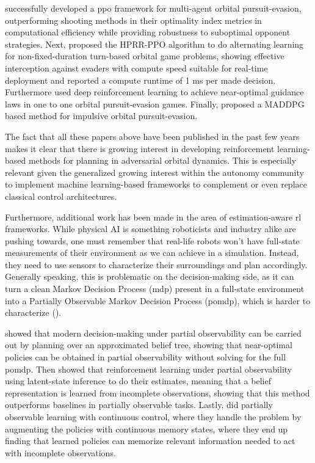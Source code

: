  \cite{li2025heterogeneousppo} successfully developed a \acs{ppo} framework for multi-agent orbital pursuit-evasion, outperforming shooting methods in their optimality index metrics in computational efficiency while providing robustness to suboptimal opponent strategies. Next, \cite{cao2026historyawareppo} proposed the HPRR-PPO algorithm to do alternating learning for non-fixed-duration turn-based orbital game problems, showing effective interception against evaders with compute speed suitable for real-time deployment and reported a compute runtime of 1 ms per made decision. Furthermore \cite{zhang2022nearoptimal} used deep reinforcement learning to achieve near-optimal guidance laws in one to one orbital pursuit-evasion games. Finally, \cite{zhao2023prdmaddpg} proposed a MADDPG based method for impulsive orbital pursuit-evasion.

The fact that all these papers above have been published in the past few years makes it clear
that there is growing interest in developing reinforcement learning-based methods for planning in adversarial orbital dynamics. This is especially relevant given the generalized growing interest within the autonomy community to implement machine learning-based frameworks to complement or even replace classical control architectures. 


Furthermore, additional work has been made in the area of estimation-aware \acs{rl} frameworks. While physical AI is something roboticists and industry alike are pushing towards, one must remember that real-life robots won't have full-state measurements of their environment as we can achieve in a simulation. Instead, they need to use sensors to characterize their surroundings and plan accordingly. Generally speaking, this is problematic on the decision-making side, as it can turn a clean Markov Decision Process (\acs{mdp}) present in a full-state environment into a Partially Observable Markov Decision Process (\acs{pomdp}), which is harder to characterize (\cite{kaelbling1998pomdp}). 

 \cite{ye2017despot} showed that modern decision-making under partial observability can be carried out by planning over an approximated belief tree, showing that near-optimal policies can be obtained in partial observability without solving for the full \acs{pomdp}. Then \cite{igl2018dvrl} showed that reinforcement learning under partial observability using latent-state inference to do their estimates, meaning that a belief representation is learned from incomplete observations, showing that this method outperforms baselines in partially observable tasks. Lastly, \cite{zhang2015continuousmemory} did partially observable learning with continuous control, where they handle the problem by augmenting the policies with continuous memory states, where they end up finding that learned policies can memorize relevant information needed to act with incomplete observations.

